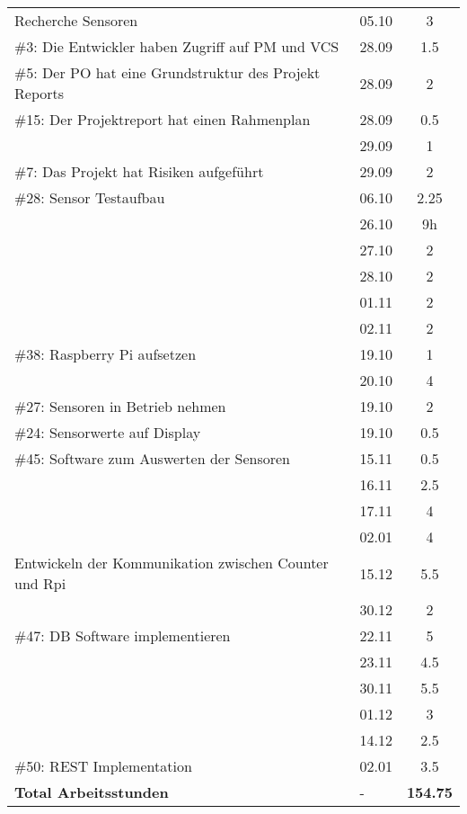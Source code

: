 \documentclass[a4paper, 10pt, fleqn]{article}
\newcommand{\footer}{\midrule\textbf{Total Arbeitsstunden}&-&\textbf{154.75}\\\midrule\bottomrule}
\begin{document}
\begin{longtable}{p{9cm}|p{2cm}|c}
        Recherche Sensoren & 05.10 & 3\\
        \#3: Die Entwickler haben Zugriff auf PM und VCS& 28.09 & 1.5\\
        \#5: Der PO hat eine Grundstruktur des Projekt Reports& 28.09 & 2\\
        \#15: Der Projektreport hat einen Rahmenplan & 28.09 & 0.5\\
        & 29.09 & 1\\
        \#7: Das Projekt hat Risiken aufgeführt & 29.09 & 2\\
        \#28: Sensor Testaufbau & 06.10 & 2.25\\
        & 26.10 & 9h \\
        & 27.10 & 2\\
        & 28.10 & 2\\
        & 01.11 & 2\\
        & 02.11 & 2\\
        \#38: Raspberry Pi aufsetzen & 19.10 & 1\\
        & 20.10 & 4\\
        \#27: Sensoren in Betrieb nehmen & 19.10 & 2\\
        \#24: Sensorwerte auf Display & 19.10 & 0.5\\
        \#45: Software zum Auswerten der Sensoren & 15.11 & 0.5\\
        & 16.11 & 2.5\\
        & 17.11 & 4\\
        & 02.01 & 4\\
        Entwickeln der Kommunikation zwischen Counter und Rpi & 15.12 & 5.5\\
        & 30.12 & 2\\
        \#47: DB Software implementieren & 22.11 & 5\\
        & 23.11 & 4.5\\
        & 30.11 & 5.5\\
        & 01.12 & 3\\
        & 14.12 & 2.5\\
        \#50: REST Implementation & 02.01 & 3.5\\
        
        \footer
	\end{longtable}
\end{document}
